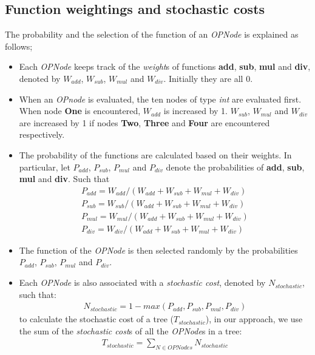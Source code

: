 \subsection{Function weightings and stochastic costs}
The probability and the selection of the function of an \emph{OPNode} is explained as follows;

\begin{itemize}
	\item Each \emph{OPNode} keeps track of the \emph{weight}s of functions \textbf{add}, \textbf{sub}, \textbf{mul} and \textbf{div}, denoted by $W_{add}$, $W_{sub}$, $W_{mul}$ and $W_{div}$. Initially they are all 0.
	\item When an \emph{OPnode} is evaluated, the ten nodes of type \emph{int} are evaluated first. When node \textbf{One} is encountered, $W_{add}$ is increased by 1. $W_{sub}$, $W_{mul}$ and $W_{div}$ are increased by 1 if nodes \textbf{Two}, \textbf{Three} and \textbf{Four} are encountered respectively.
	\item The probability of the functions are calculated based on their weights. In particular, let $P_{add}$, $P_{sub}$, $P_{mul}$ and $P_{div}$ denote the probabilities of \textbf{add}, \textbf{sub}, \textbf{mul} and \textbf{div}. Such that
	\begin{align*}
	P_{add} = W_{add} / (W_{add} + W_{sub} + W_{mul} + W_{div})\\
	P_{sub} = W_{sub} / (W_{add} + W_{sub} + W_{mul} + W_{div})\\
	P_{mul} = W_{mul} / (W_{add} + W_{sub} + W_{mul} + W_{div})\\
	P_{div} = W_{div} / (W_{add} + W_{sub} + W_{mul} + W_{div})
	\end{align*}
	\item The function of the \emph{OPNode} is then selected randomly by the probabilities $P_{add}$, $P_{sub}$, $P_{mul}$ and $P_{div}$.
	\item Each \emph{OPNode} is also associated with a \emph{stochastic cost}, denoted by $N_{stochastic}$, such that:
	\begin{align*}
	N_{stochastic} = 1 - max(P_{add}, P_{sub}, P_{mul}, P_{div})
	\end{align*}
	to calculate the stochastic cost of a tree ($T_{stochastic}$), in our approach, we use the sum of the \emph{stochastic cost}s of all the \emph{OPNode}s in a tree:
	\begin{align*}
	T_{stochastic} = \sum\nolimits_{N \in OPNodes} N_{stochastic}
	\end{align*}
\end{itemize}

